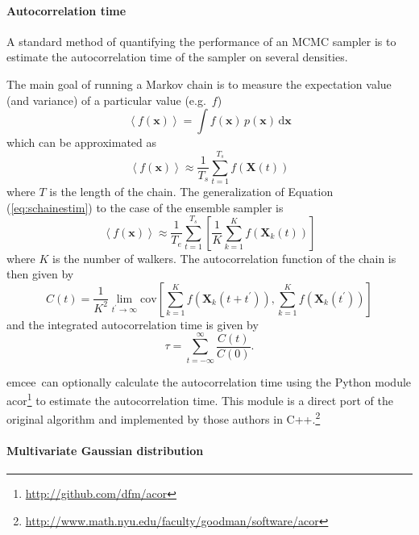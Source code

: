 \documentclass[12pt,preprint]{aastex}
\newcommand{\project}[1]{{\sffamily #1}}
\newcommand{\thisplain}{emcee}
\newcommand{\this}{\project{\thisplain}}
\newcommand{\eq}[1]{Equation (\ref{eq:#1})}
\newcommand{\eqlabel}[1]{\label{eq:#1}}
\newcommand{\dd}{\mathrm{d}}
\begin{document}
\paragraph{Autocorrelation time}

A standard method of quantifying the performance of an MCMC sampler is to
estimate the autocorrelation time of the sampler on several densities.

The main goal of running a Markov chain is to measure the expectation value
(and variance) of a particular value (e.g.~$f$)
\begin{equation}
    \left < f(\mathbf{x}) \right > = \int f(\mathbf{x}) \, p (\mathbf{x}) \,
            \dd \mathbf{x}
\end{equation}
which can be approximated as
\begin{equation}
    \eqlabel{schainestim}
    \left < f(\mathbf{x}) \right > \approx \frac{1}{T_s} \sum_{t=1}^{T_s}
            f(\mathbf{X}(t))
\end{equation}
where $T$ is the length of the chain.  The generalization of \eq{schainestim}
to the case of the ensemble sampler is
\begin{equation}
    \eqlabel{echainestim}
    \left < f(\mathbf{x}) \right > \approx \frac{1}{T_e} \sum_{t=1}^{T_s}
        \left [ \frac{1}{K} \sum_{k = 1}^{K} f(\mathbf{X}_k(t)) \right ]
\end{equation}
where $K$ is the number of walkers.  The autocorrelation function of the chain
is then given by
\begin{equation}
    C (t) = \frac{1}{K^2} \lim_{t^\prime \to \infty} \mathrm{cov}
            \left [ \sum_{k = 1}^{K} f(\mathbf{X}_k (t+t^\prime)),
            \sum_{k = 1}^{K} f(\mathbf{X}_k (t^\prime)) \right ]
\end{equation}
and the integrated autocorrelation time is given by
\begin{equation}
    \tau = \sum_{t= -\infty} ^{\infty} \frac{C(t)}{C(0)} .
\end{equation}

\this\ can optionally calculate the autocorrelation time using the Python
module \project{acor}\footnote{\url{http://github.com/dfm/acor}} to estimate
the autocorrelation time. This module is a direct port of the original
algorithm  and implemented by those
authors in
C++.\footnote{\url{http://www.math.nyu.edu/faculty/goodman/software/acor}}

\paragraph{Multivariate Gaussian distribution}
\end{document}
